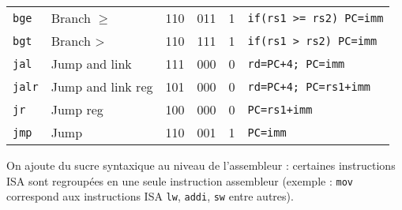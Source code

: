 \documentclass[a4paper]{article}
\begin{document}
\begin{longtable}{|l|l|c|c|c|l|}
        \texttt{bge}   & Branch \(\geqslant\)            & 110    & 011    & 1      & \texttt{if(rs1 >= rs2) PC=imm}\\
        \texttt{bgt}   & Branch >                        & 110    & 111    & 1      & \texttt{if(rs1 > rs2) PC=imm} \\
        \hline
        \texttt{jal}   & Jump and link                   & 111    & 000    & 0      &\texttt{rd=PC+4; PC=imm}       \\
        \texttt{jalr}  & Jump and link reg               & 101    & 000    & 0      &\texttt{rd=PC+4; PC=rs1+imm}   \\
        \texttt{jr}    & Jump reg                        & 100    & 000    & 0      &\texttt{PC=rs1+imm}            \\
        \texttt{jmp}   & Jump                            & 110    & 001    & 1      &\texttt{PC=imm}                \\
        \hline
    \end{longtable}

    On ajoute du sucre syntaxique au niveau de l'assembleur : certaines instructions ISA sont regroupées en une seule instruction assembleur (exemple : \texttt{mov} correspond aux instructions ISA \texttt{lw}, \texttt{addi}, \texttt{sw} entre autres).
\end{document}
